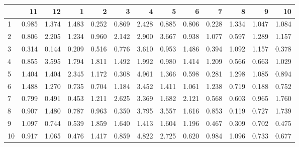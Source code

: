 \begin{tabular}{lrrrrrrrrrrrr}
\toprule
{} &     11 &     12 &     1  &     2  &     3  &     4  &     5  &     6  &     7  &     8  &     9  &     10 \\
\midrule
1  &  0.985 &  1.374 &  1.483 &  0.252 &  0.869 &  2.428 &  0.885 &  0.806 &  0.228 &  1.334 &  1.047 &  1.084 \\
2  &  0.806 &  2.205 &  1.234 &  0.960 &  2.142 &  2.900 &  3.667 &  0.938 &  1.077 &  0.597 &  1.289 &  1.157 \\
3  &  0.314 &  0.144 &  0.209 &  0.516 &  0.776 &  3.610 &  0.953 &  1.486 &  0.394 &  1.092 &  1.157 &  0.378 \\
4  &  0.855 &  3.595 &  1.794 &  1.811 &  1.492 &  1.992 &  0.980 &  1.414 &  1.209 &  0.566 &  0.663 &  1.029 \\
5  &  1.404 &  1.404 &  2.345 &  1.172 &  0.308 &  4.961 &  1.366 &  0.598 &  0.281 &  1.298 &  1.085 &  0.894 \\
6  &  1.488 &  1.270 &  0.735 &  0.704 &  1.184 &  3.452 &  1.411 &  1.061 &  1.238 &  0.719 &  0.188 &  0.752 \\
7  &  0.799 &  0.491 &  0.453 &  1.211 &  2.625 &  3.369 &  1.682 &  2.121 &  0.568 &  0.603 &  0.965 &  1.760 \\
8  &  0.907 &  1.480 &  0.787 &  0.963 &  0.350 &  3.795 &  3.557 &  1.616 &  0.853 &  0.119 &  0.727 &  1.739 \\
9  &  1.097 &  0.744 &  0.539 &  1.859 &  1.640 &  1.413 &  1.604 &  1.196 &  0.467 &  0.309 &  0.702 &  0.475 \\
10 &  0.917 &  1.065 &  0.476 &  1.417 &  0.859 &  4.822 &  2.725 &  0.620 &  0.984 &  1.096 &  0.733 &  0.677 \\
\bottomrule
\end{tabular}

